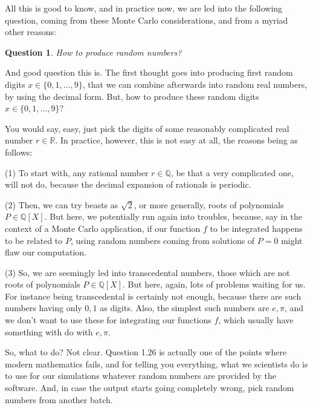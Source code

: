 \documentclass[12pt]{amsbook}
\newtheorem{question}[theorem]{Question}
\begin{document}
All this is good to know, and in practice now, we are led into the following question, coming from these Monte Carlo considerations, and from a myriad other reasons:

\begin{question}
How to produce random numbers?
\end{question}

And good question this is. The first thought goes into producing first random digits $x\in\{0,1,\ldots,9\}$, that we can combine afterwards into random real numbers, by using the decimal form. But, how to produce these random digits $x\in\{0,1,\ldots,9\}$?

\bigskip

You would say, easy, just pick the digits of some reasonably complicated real number $r\in\mathbb R$. In practice, however, this is not easy at all, the reasons being as follows:

\bigskip

(1) To start with, any rational number $r\in\mathbb Q$, be that a very complicated one, will not do, because the decimal expansion of rationals is periodic.

\bigskip

(2) Then, we can try beasts as $\sqrt{2}$, or more generally, roots of polynomials $P\in\mathbb Q[X]$. But here, we potentially run again into troubles, because, say in the context of a Monte Carlo application, if our function $f$ to be integrated happens to be related to $P$, using random numbers coming from solutions of $P=0$ might flaw our computation.

\bigskip

(3) So, we are seemingly led into transcedental numbers, those which are not roots of polynomials $P\in\mathbb Q[X]$. But here, again, lots of problems waiting for us. For instance being transcedental is certainly not enough, because there are such numbers having only $0,1$ as digits. Also, the simplest such numbers are $e,\pi$, and we don't want to use these for integrating our functions $f$, which usually have something with do with $e,\pi$.

\bigskip

So, what to do? Not clear. Question 1.26 is actually one of the points where modern mathematics fails, and for telling you everything, what we scientists do is to use for our simulations whatever random numbers are provided by the software. And, in case the output starts going completely wrong, pick random numbers from another batch.
\end{document}

